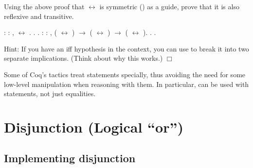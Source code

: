 \documentclass[12pt]{report}
\begin{document}
 Using the above proof that \ensuremath{\leftrightarrow} is symmetric () as
    a guide, prove that it is also reflexive and transitive. \begin{coqdoccode}
\coqdocemptyline
\coqdocnoindent
{}  : \coqdockw{\ensuremath{\forall}}  : , \coqdoceol
\coqdocindent{1.00em}
 \ensuremath{\leftrightarrow} .\coqdoceol
\coqdocnoindent
{}.\coqdoceol
 .\coqdoceol
\coqdocemptyline
\coqdocnoindent
{}  : \coqdockw{\ensuremath{\forall}}    : , \coqdoceol
\coqdocindent{1.00em}
( \ensuremath{\leftrightarrow} ) \ensuremath{\rightarrow} ( \ensuremath{\leftrightarrow} ) \ensuremath{\rightarrow} ( \ensuremath{\leftrightarrow} ).\coqdoceol
\coqdocnoindent
{}.\coqdoceol
 .\coqdoceol
\coqdocemptyline
\end{coqdoccode}
Hint: If you have an iff hypothesis in the context, you can use
     to break it into two separate implications.  (Think
    about why this works.)  \ensuremath{\Box} 

 Some of Coq's tactics treat  statements specially, thus
    avoiding the need for some low-level manipulation when reasoning
    with them.  In particular,  can be used with 
    statements, not just equalities. \begin{coqdoccode}
\coqdocemptyline
\end{coqdoccode}
\section{Disjunction (Logical ``or'')}



\subsection{Implementing disjunction}
\end{document}
